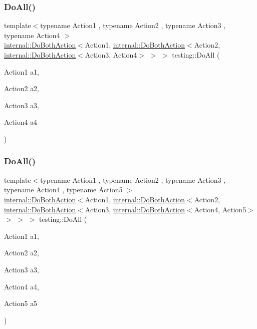 \subsubsection{\texorpdfstring{DoAll()}{DoAll()}\hspace{0.1cm}{\footnotesize\ttfamily [3/9]}}
{\footnotesize\ttfamily template$<$typename Action1 , typename Action2 , typename Action3 , typename Action4 $>$ \\
\mbox{\hyperlink{classtesting_1_1internal_1_1DoBothAction}{internal\+::\+Do\+Both\+Action}}$<$Action1, \mbox{\hyperlink{classtesting_1_1internal_1_1DoBothAction}{internal\+::\+Do\+Both\+Action}}$<$Action2, \mbox{\hyperlink{classtesting_1_1internal_1_1DoBothAction}{internal\+::\+Do\+Both\+Action}}$<$Action3, Action4$>$ $>$ $>$ testing\+::\+Do\+All (\begin{DoxyParamCaption}\item[{Action1}]{a1,  }\item[{Action2}]{a2,  }\item[{Action3}]{a3,  }\item[{Action4}]{a4 }\end{DoxyParamCaption})\hspace{0.3cm}{\ttfamily [inline]}}

\mbox{\label{namespacetesting_a794c41d43373d7af9cebbc7f1c5e4a57}} 
\subsubsection{\texorpdfstring{DoAll()}{DoAll()}\hspace{0.1cm}{\footnotesize\ttfamily [4/9]}}
{\footnotesize\ttfamily template$<$typename Action1 , typename Action2 , typename Action3 , typename Action4 , typename Action5 $>$ \\
\mbox{\hyperlink{classtesting_1_1internal_1_1DoBothAction}{internal\+::\+Do\+Both\+Action}}$<$Action1, \mbox{\hyperlink{classtesting_1_1internal_1_1DoBothAction}{internal\+::\+Do\+Both\+Action}}$<$Action2, \mbox{\hyperlink{classtesting_1_1internal_1_1DoBothAction}{internal\+::\+Do\+Both\+Action}}$<$Action3, \mbox{\hyperlink{classtesting_1_1internal_1_1DoBothAction}{internal\+::\+Do\+Both\+Action}}$<$Action4, Action5$>$ $>$ $>$ $>$ testing\+::\+Do\+All (\begin{DoxyParamCaption}\item[{Action1}]{a1,  }\item[{Action2}]{a2,  }\item[{Action3}]{a3,  }\item[{Action4}]{a4,  }\item[{Action5}]{a5 }\end{DoxyParamCaption})\hspace{0.3cm}{\ttfamily [inline]}}

